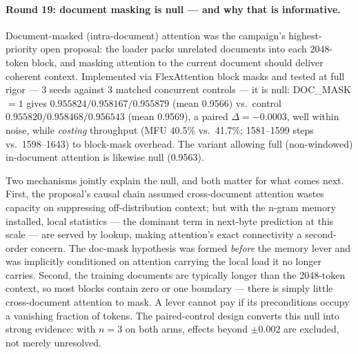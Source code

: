 \documentclass{article}
\begin{document}
\paragraph{Round 19: document masking is null --- and why that is informative.}
Document-masked (intra-document) attention was the campaign's highest-priority open proposal: the loader packs unrelated documents into each 2048-token block, and masking attention to the current document should deliver coherent context. Implemented via FlexAttention block masks \cite{dong2024flex} and tested at full rigor --- 3 seeds against 3 matched concurrent controls --- it is null: DOC\_MASK$=1$ gives $0.955824/0.958167/0.955879$ (mean 0.9566) vs.\ control $0.955820/0.958468/0.956543$ (mean 0.9569), a paired $\Delta = -0.0003$, well within noise, while \emph{costing} throughput (MFU 40.5\% vs.\ 41.7\%; 1581--1599 steps vs.\ 1598--1643) to block-mask overhead. The variant allowing full (non-windowed) in-document attention is likewise null (0.9563).

Two mechanisms jointly explain the null, and both matter for what comes next. First, the proposal's causal chain assumed cross-document attention wastes capacity on suppressing off-distribution context; but with the n-gram memory installed, local statistics --- the dominant term in next-byte prediction at this scale --- are served by lookup, making attention's exact connectivity a second-order concern. The doc-mask hypothesis was formed \emph{before} the memory lever and was implicitly conditioned on attention carrying the local load it no longer carries. Second, the training documents are typically longer than the 2048-token context, so most blocks contain zero or one boundary --- there is simply little cross-document attention to mask. A lever cannot pay if its preconditions occupy a vanishing fraction of tokens. The paired-control design converts this null into strong evidence: with $n{=}3$ on both arms, effects beyond $\pm 0.002$ are excluded, not merely unresolved.
\end{document}
